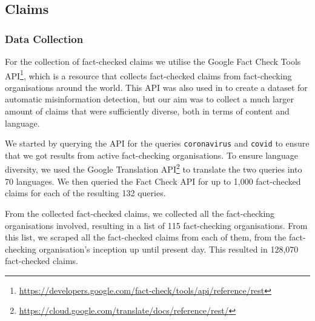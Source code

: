\documentclass[sigconf,natbib=true,anonymous=false,nonacm]{acmart}
\newif\ifpreprint
\begin{document}
\subsection{Claims}
\label{sec:claims}

\subsubsection{Data Collection}
\label{sec:claimcollection}
For the collection of fact-checked claims we utilise the Google Fact Check
Tools
API\footnote{\url{https://developers.google.com/fact-check/tools/api/reference/rest}},
which is a resource that collects fact-checked claims from fact-checking
organisations around the world. This API was also used in
\citep{shiao2021ki2te} to create a dataset for automatic misinformation
detection, but our aim was to collect a much larger amount of claims that were
sufficiently diverse, both in terms of content and language.

We started by querying the API for the queries \texttt{coronavirus} and
\texttt{covid} to ensure that we got results from active fact-checking
organisations. To ensure language diversity, we used the Google Translation
API\footnote{\url{https://cloud.google.com/translate/docs/reference/rest/}} to
translate the two queries into 70 languages\ifpreprint (see the appendix for a
list of all the languages)\fi. We then queried the Fact Check API for up to
1,000 fact-checked claims for each of the resulting 132 queries.

From the collected fact-checked claims, we collected all the fact-checking
organisations involved, resulting in a list of 115 fact-checking
organisations\ifpreprint (see the appendix for a list of all the
organisations)\fi. From this list, we scraped all the fact-checked claims from
each of them, from the fact-checking organisation's inception up until present
day. This resulted in 128,070 fact-checked claims.
\end{document}
